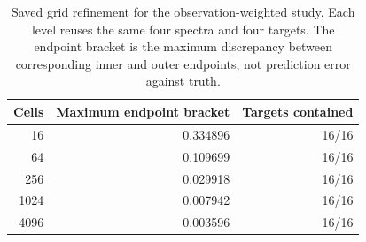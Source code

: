 \begin{table}[ht]
\centering\small
\caption{Saved grid refinement for the observation-weighted study. Each level reuses the same four spectra and four targets. The endpoint bracket is the maximum discrepancy between corresponding inner and outer endpoints, not prediction error against truth.}
\label{tab:mcs-grid}
\begin{tabular}{rrr}
\toprule
Cells & Maximum endpoint bracket & Targets contained\\\midrule
16 & 0.334896 & 16/16\\
64 & 0.109699 & 16/16\\
256 & 0.029918 & 16/16\\
1024 & 0.007942 & 16/16\\
4096 & 0.003596 & 16/16\\
\bottomrule\end{tabular}
\end{table}
